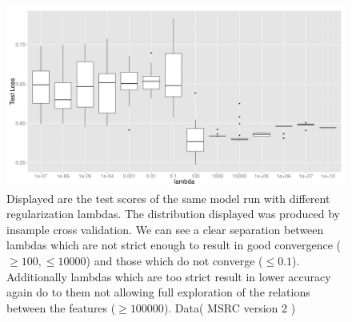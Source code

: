 \begin{figure}
  \centering
  \includegraphics[width=1.0\textwidth]{images/tesatError_vs_lamda_msrc.png}
  \caption{   Displayed are the test scores of the same model run with different regularization lambdas. The distribution displayed was produced by insample cross validation. We can see a clear separation between lambdas which are not strict enough to result in good convergence ($\geq 100, \leq 10000$) and those which do not converge ($\leq 0.1$). Additionally lambdas which are too strict result in lower accuracy again do to them not allowing full exploration of the relations between the features ($\geq 100000$). Data( MSRC version 2 \cite{msrcDataSet}) } 
  \label{fig:lambda1}
\end{figure} 


